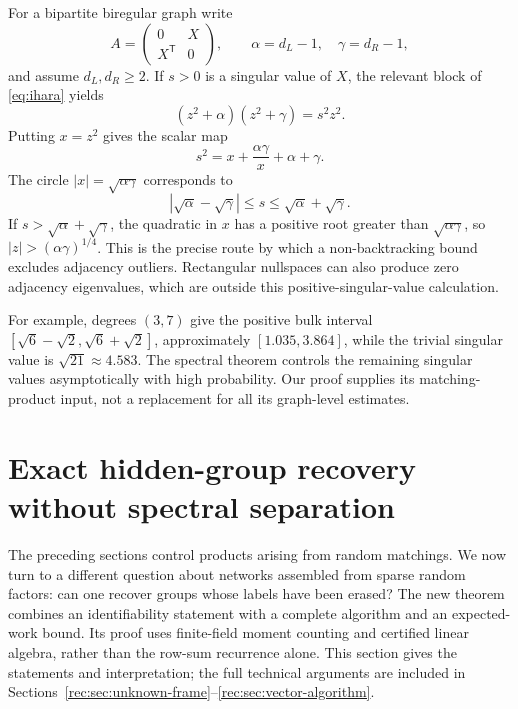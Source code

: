 \documentclass[11pt]{article}
\theoremstyle{definition}
\theoremstyle{remark}
\newcommand{\1}{\mathbf 1}
\begin{document}
For a bipartite biregular graph write
\[
A=\begin{pmatrix}0&X\\X^{\mathsf T}&0\end{pmatrix},\qquad
\alpha=d_L-1,\quad\gamma=d_R-1,
\]
and assume $d_L,d_R\ge2$. If $s>0$ is a singular value of $X$, the relevant block of \eqref{eq:ihara} yields
\begin{equation}\label{eq:biregularbridge}
(z^2+\alpha)(z^2+\gamma)=s^2z^2.
\end{equation}
Putting $x=z^2$ gives the scalar map
\begin{equation}\label{eq:scalarbridge}
s^2=x+\frac{\alpha\gamma}{x}+\alpha+\gamma.
\end{equation}
The circle $|x|=\sqrt{\alpha\gamma}$ corresponds to
\[
|\sqrt\alpha-\sqrt\gamma|\le s\le\sqrt\alpha+\sqrt\gamma.
\]
If $s>\sqrt\alpha+\sqrt\gamma$, the quadratic in $x$ has a positive root greater than $\sqrt{\alpha\gamma}$, so $|z|>(\alpha\gamma)^{1/4}$. This is the precise route by which a non-backtracking bound excludes adjacency outliers. Rectangular nullspaces can also produce zero adjacency eigenvalues, which are outside this positive-singular-value calculation.

For example, degrees $(3,7)$ give the positive bulk interval $[\sqrt6-\sqrt2,\sqrt6+\sqrt2]$, approximately $[1.035,3.864]$, while the trivial singular value is $\sqrt{21}\approx4.583$. The spectral theorem controls the remaining singular values asymptotically with high probability. Our proof supplies its matching-product input, not a replacement for all its graph-level estimates.



\clearpage
\section{Exact hidden-group recovery without spectral separation}
\label{sec:recovery-overview}
The preceding sections control products arising from random matchings.
We now turn to a different question about networks assembled from sparse
random factors: can one recover groups whose labels have been erased?
The new theorem combines an identifiability statement with a complete
algorithm and an expected-work bound. Its proof uses finite-field moment
counting and certified linear algebra, rather than the row-sum recurrence
alone. This section gives the statements and interpretation; the full
technical arguments are included in Sections~\ref{rec:sec:unknown-frame}--\ref{rec:sec:vector-algorithm}.
\end{document}
